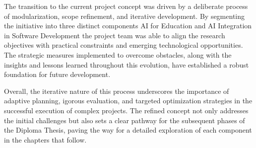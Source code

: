 The transition to the current project concept was driven by a deliberate process of modularization, scope refinement, 
and iterative development. By segmenting the initiative into three distinct components AI for Education and AI Integration in Software Development 
the project team was able to align the research objectives with practical constraints and emerging technological opportunities. 
The strategic measures implemented to overcome obstacles, along with the insights and lessons learned throughout this evolution, 
have established a robust foundation for future development.

Overall, the iterative nature of this process underscores the importance of adaptive planning, 
igorous evaluation, and targeted optimization strategies in the successful execution of complex projects. 
The refined concept not only addresses the initial challenges but also sets a clear pathway for the subsequent phases of the Diploma Thesis, 
paving the way for a detailed exploration of each component in the chapters that follow.

